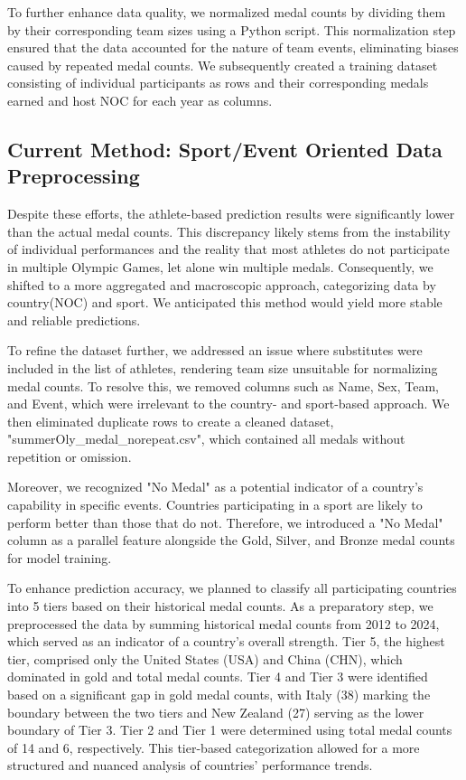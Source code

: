 \documentclass{mcmthesis}
\begin{document}
To further enhance data quality, we normalized medal counts by dividing them by their corresponding team sizes using a Python script. This normalization step ensured that the data accounted for the nature of team events, eliminating biases caused by repeated medal counts. We subsequently created a training dataset consisting of individual participants as rows and their corresponding medals earned and host NOC for each year as columns.

\subsection{Current Method: Sport/Event Oriented Data Preprocessing}

Despite these efforts, the athlete-based prediction results were significantly lower than the actual medal counts. This discrepancy likely stems from the instability of individual performances and the reality that most athletes do not participate in multiple Olympic Games, let alone win multiple medals. Consequently, we shifted to a more aggregated and macroscopic approach, categorizing data by country(NOC) and sport. We anticipated this method would yield more stable and reliable predictions.

To refine the dataset further, we addressed an issue where substitutes were included in the list of athletes, rendering team size unsuitable for normalizing medal counts. To resolve this, we removed columns such as Name, Sex, Team, and Event, which were irrelevant to the country- and sport-based approach. We then eliminated duplicate rows to create a cleaned dataset, "summerOly\_medal\_norepeat.csv", which contained all medals without repetition or omission.

Moreover, we recognized "No Medal" as a potential indicator of a country's capability in specific events. Countries participating in a sport are likely to perform better than those that do not. Therefore, we introduced a "No Medal" column as a parallel feature alongside the Gold, Silver, and Bronze medal counts for model training.

To enhance prediction accuracy, we planned to classify all participating countries into 5 tiers based on their historical medal counts. As a preparatory step, we preprocessed the data by summing historical medal counts from 2012 to 2024, which served as an indicator of a country's overall strength. Tier 5, the highest tier, comprised only the United States (USA) and China (CHN), which dominated in gold and total medal counts. Tier 4 and Tier 3 were identified based on a significant gap in gold medal counts, with Italy (38) marking the boundary between the two tiers and New Zealand (27) serving as the lower boundary of Tier 3. Tier 2 and Tier 1 were determined using total medal counts of 14 and 6, respectively. This tier-based categorization allowed for a more structured and nuanced analysis of countries' performance trends.
\end{document}
